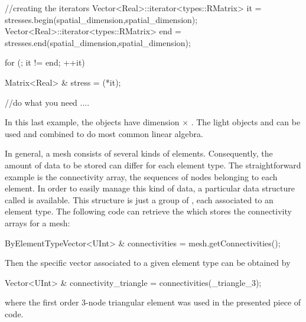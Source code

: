 \begin{cpp}
  //creating the iterators
  Vector<Real>::iterator<types::RMatrix> it  = stresses.begin(spatial_dimension,spatial_dimension);
  Vector<Real>::iterator<types::RMatrix> end = stresses.end(spatial_dimension,spatial_dimension);

  for (; it != end; ++it){
    Matrix<Real> & stress = (*it);

    //do what you need
    ....
  }
\end{cpp}
In this last example, the  objects have dimension
 $\times$ .
The light objects  and  can be used and combined
to do most common linear algebra.

In general, a mesh consists of several kinds of elements. Consequently, the
amount of data to be stored can differ for each element type. The straightforward
example is the connectivity array, \ie the sequences of nodes belonging to
each element. In order to easily manage this kind of data, a
particular data structure called  is available.
This structure is just a group of , each associated to an element
type. The following code can retrieve the 
which stores the connectivity arrays for a mesh:
\begin{cpp}
  ByElementTypeVector<UInt> & connectivities = mesh.getConnectivities();
\end{cpp}
Then the specific vector associated to a given element type can be
obtained by
\begin{cpp}
  Vector<UInt> & connectivity_triangle = connectivities(_triangle_3);
\end{cpp}
where the first order 3-node triangular element was used in the presented
piece of code.

